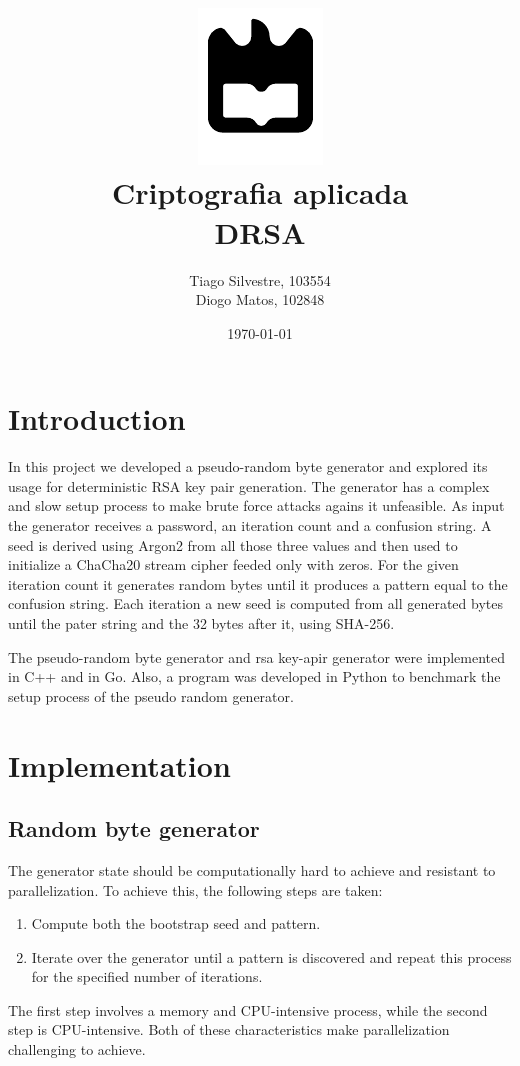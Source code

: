 \documentclass{article} %
\title{%
    \includegraphics[width=0.3\linewidth]{./assets/logo.pdf}\\[20pt]
    \Huge \bfseries Criptografia aplicada \\[10pt]
    \Large DRSA
}
\author{Tiago Silvestre, 103554 \\ Diogo Matos, 102848}
\date{\today}
\begin{document}
\maketitle

\newpage

\tableofcontents

\clearpage

\section{Introduction}
In this project we developed a pseudo-random byte generator and explored its usage for deterministic RSA key pair generation. 
The generator has a complex and slow setup process to make brute force attacks agains it unfeasible. As input the generator receives a password, an iteration count and a confusion string.
A seed is derived using Argon2 from all those three values and then used to initialize a ChaCha20 stream cipher feeded only with zeros. For the given iteration count it generates random bytes until it produces 
a pattern equal to the confusion string. Each iteration a new seed is computed from all generated bytes until the pater string and the 32 bytes after it, using SHA-256.

The pseudo-random byte generator and rsa key-apir generator were implemented in C++ and in Go. Also, a program was developed in Python to benchmark the setup process of the pseudo random generator.

\section{Implementation}
\subsection{Random byte generator}
The generator state should be computationally hard to achieve and resistant to parallelization. To achieve this, the following steps are taken:

\begin{enumerate}
    \item Compute both the bootstrap seed and pattern.
    \item Iterate over the generator until a pattern is discovered and repeat this process for the specified number of iterations.
\end{enumerate}

The first step involves a memory and CPU-intensive process, while the second step is CPU-intensive. Both of these characteristics make parallelization challenging to achieve.
\end{document}
